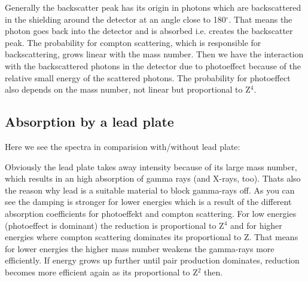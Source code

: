 \documentclass[bigchapter,colorback,accentcolor=tud4b,linedtoc,11pt]{tudreport}
\begin{document}
Generally the backscatter peak has its origin in photons which are backscattered in the shielding around the detector at an angle close to 180$^{\circ}$. That means the photon goes back into the detector and is absorbed i.e. creates the backscatter peak. The probability for compton scattering, which is responsible for backscattering, grows linear with the mass number. Then we have the interaction with the backscattered photons in the detector due to photoeffect because of the relative small energy of the scattered photons. The probability for photoeffect also depends on the mass number, not linear but proportional to Z$^4$. 

\subsection{Absorption by a lead plate}

Here we see the spectra in comparision with/without lead plate:

\begin{center}
\begin{figure}[H]
\end{figure}
\end{center}

Obviously the lead plate takes away intensity because of its large mass number, which results in an high absorption of gamma rays (and X-rays, too). Thats also the reason why lead is a suitable material to block gamma-rays off. As you can see the damping is stronger for lower energies which is a result of the different absorption coefficients for photoeffekt and compton scattering. For low energies (photoeffect is dominant) the reduction is proportional to Z$^4$ and for higher energies where compton scattering dominates its proportional to Z. That means for lower energies the higher mass number weakens the gamma-rays more efficiently. If energy grows up further until pair production dominates, reduction becomes more efficient again as its proportional to Z$^2$ then.
\end{document}
